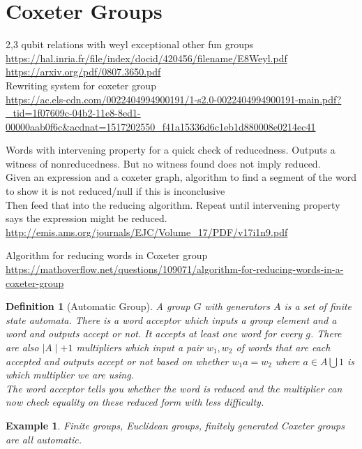 \documentclass[11pt]{article}
\theoremstyle{change}
\newtheorem{definition}[equation]{Definition}
\newtheorem{example}[equation]{Example}
\theoremstyle{nonumberplain}
\numberwithin{equation}{section}
\newcommand\abs[1]{ \mid #1 \mid }
\begin{document}
\section{Coxeter Groups}

2,3 qubit relations with weyl exceptional other fun groups\\
\url{https://hal.inria.fr/file/index/docid/420456/filename/E8Weyl.pdf}\\
\url{https://arxiv.org/pdf/0807.3650.pdf}\\

Rewriting system for coxeter group\\
\url{https://ac.els-cdn.com/0022404994900191/1-s2.0-0022404994900191-main.pdf?_tid=1f07609c-04b2-11e8-8ed1-00000aab0f6c&acdnat=1517202550_f41a15336d6c1eb1d880008e0214ec41}

Words with intervening property for a quick check of reducedness. Outputs a witness of nonreducedness. But no witness found does not imply reduced.\\
Given an expression and a coxeter graph, algorithm to find a segment of the word to show it is not reduced/null if this is inconclusive\\
Then feed that into the reducing algorithm. Repeat until intervening property says the expression might be reduced.\\
\url{http://emis.ams.org/journals/EJC/Volume_17/PDF/v17i1n9.pdf}

Algorithm for reducing words in Coxeter group\\
\url{https://mathoverflow.net/questions/109071/algorithm-for-reducing-words-in-a-coxeter-group}

\begin{definition}[Automatic Group]
A group $G$ with generators $A$ is a set of finite state automata. There is a word acceptor which inputs a group element and a word and outputs accept or not. It accepts at least one word for every $g$. There are also $\abs{A}+1$ multipliers which input a pair $w_1,w_2$ of words that are each accepted and outputs accept or not based on whether $w_1 a = w_2$ where $a \in A \bigcup 1$ is which multiplier we are using.\\
The word acceptor tells you whether the word is reduced and the multiplier can now check equality on these reduced form with less difficulty.
\end{definition}

\begin{example}
Finite groups, Euclidean groups, finitely generated Coxeter groups are all automatic.
\end{example}
\end{document}
